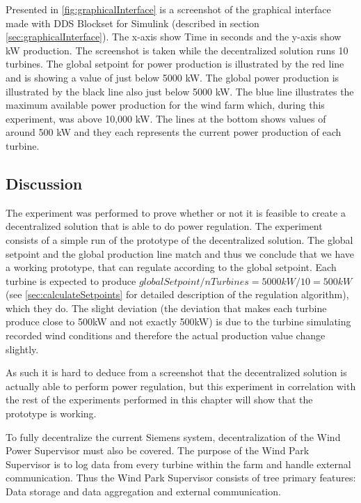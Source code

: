 Presented in \cref{fig:graphicalInterface} is a screenshot of the graphical interface made with DDS Blockset for Simulink (described in section \cref{sec:graphicalInterface}). The x-axis show Time in seconds and the y-axis show kW production. The screenshot is taken while the decentralized solution runs 10 turbines.
The global setpoint for power production is illustrated by the red line and is showing a value of just below 5000 kW. The global power production is illustrated by the black line also just below 5000 kW.
The blue line illustrates the maximum available power production for the wind farm which, during this experiment, was above 10,000 kW. The lines at the bottom shows values of around 500 kW and they each represents the current power production of each turbine.

\subsection{Discussion}\label{feas:discussion}
The experiment was performed to prove whether or not it is feasible to create a decentralized solution that is able to do power regulation. The experiment consists of a simple run of the prototype of the decentralized solution. The global setpoint and the global production line match and thus we conclude that we have a working prototype, that can regulate according to the global setpoint. Each turbine is expected to produce $globalSetpoint/nTurbines=5000kW/10=500kW$(see \cref{sec:calculateSetpoints} for detailed description of the regulation algorithm), which they do. The slight deviation (the deviation that makes each turbine produce close to 500kW and not exactly 500kW) is due to the turbine simulating recorded wind conditions and therefore the actual production value change slightly.

As such it is hard to deduce from a screenshot that the decentralized solution is actually able to perform power regulation, but this experiment in correlation with the rest of the experiments performed in this chapter will show that the prototype is working.

To fully decentralize the current Siemens system, decentralization of the Wind Power Supervisor must also be covered. The purpose of the Wind Park Supervisor is to log data from every turbine within the farm and handle external communication. Thus the Wind Park Supervisor consists of tree primary features: Data storage and data aggregation and external communication. 

